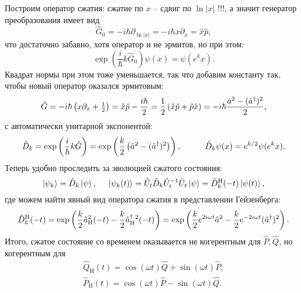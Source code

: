Построим оператор сжатия: сжатие по $x$ -- сдвиг по $\ln |x|$ !!!, а значит генератор преобразования имеет вид
\begin{equation*}
    \hat{G}_0 = - i \hbar \partial_{\ln |x|} = - i \hbar x \partial_x = \hat{x} \hat{p},
\end{equation*}
что достаточно забавно, хотя оператор и не эрмитов, но при этом:
\begin{equation*}
    \exp\left(\frac{i}{\hbar} k \hat{G}_0 \right) \psi(x) = \psi(e^k x).
\end{equation*}
Квадрат нормы при этом тоже уменьшается, так что добавим константу так, чтобы новый оператор оказался эрмитовым:
\begin{equation*}
    \hat{G} = - i \hbar \left(x \partial_x + \tfrac{1}{2}\right) = \hat{x} \hat{p} - \frac{i \hbar}{2} = \frac{1}{2} \left(\hat{x} \hat{p} + \hat{p} \hat{x}\right) = - i \hbar \frac{\hat{a}^2 - (\hat{a}^{\dag})^2}{2},
\end{equation*}
с автоматически унитарной экспонентой:
\begin{equation*}
    \hat{D}_k = \exp\left(\frac{i}{\hbar} k \hat{G}\right) = \exp\left(
        \frac{k}{2} \left(\hat{a}^2 - (\hat{a}\con)^2\right)
    \right),
    \hspace{10 mm}  
    \hat{D}_k \psi(x) = e^{k/2}\psi(e^k x).
\end{equation*}
Теперь удобно проследить за эволюцией сжатого состояния:
\begin{equation*}
    \left| \psi_k \right\rangle = \hat{D}_k \left| \psi \right\rangle,
    \hspace{5 mm} 
    \left| \psi_k (t) \right\rangle = \hat{U}_t \hat{D}_k \hat{U}_{t}^{-1} \hat{U}_t \left| \psi \right\rangle = \hat{D}_k^{\text{H}} (-t) \left| \psi(t) \right\rangle,
\end{equation*}
где можем найти явный вид оператора сжатия в представлении Гейзенберга:
\begin{equation*}
    \hat{D}_k^{\text{H}} (-t) = \exp \left(
        \frac{k}{2} \hat{a}_{\text{H}}^2(-t) - \frac{k}{2} \hat{a}^{\dag}_{\text{H}}{}^2 (-t)
    \right) = \exp  \left(
       \frac{k}{2} e^{2 i \omega t} \hat{a}^2 - \frac{k}{2} e^{-2 i \omega t} (\hat{a}^{\dag})^2
    \right).
\end{equation*}
Итого, сжатое состояние со временем оказывается не когерентным для $\hat{P}, \hat{Q}$, но когерентным для
\begin{align*}
    \hat{Q}_{\text{H}} (t) = \cos (\omega t) \hat{Q} + \sin(\omega t) \hat{P}, \\
    \hat{P}_{\text{H}} (t) = \cos (\omega t) \hat{P} -\sin (\omega t) \hat{Q}.
\end{align*}
